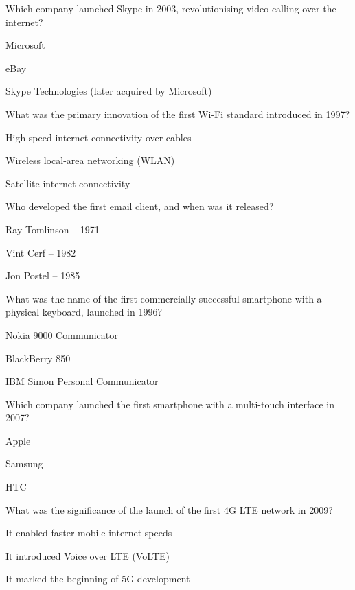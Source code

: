 \begin{enhancedmcq}{Which company launched Skype in 2003, revolutionising video calling over the internet?}
\item Microsoft
\item eBay
\item Skype Technologies (later acquired by Microsoft)

\end{enhancedmcq}
\begin{enhancedmcq}{What was the primary innovation of the first Wi-Fi standard introduced in 1997?}
\item High-speed internet connectivity over cables
\item Wireless local-area networking (WLAN)
\item Satellite internet connectivity

\end{enhancedmcq}
\begin{enhancedmcq}{Who developed the first email client, and when was it released?}
\item Ray Tomlinson – 1971
\item Vint Cerf – 1982
\item Jon Postel – 1985

\end{enhancedmcq}
\begin{enhancedmcq}{What was the name of the first commercially successful smartphone with a physical keyboard, launched in 1996?}
\item Nokia 9000 Communicator
\item BlackBerry 850
\item IBM Simon Personal Communicator

\end{enhancedmcq}
\begin{enhancedmcq}{Which company launched the first smartphone with a multi-touch interface in 2007?}
\item Apple
\item Samsung
\item HTC

\end{enhancedmcq}
\begin{enhancedmcq}{What was the significance of the launch of the first 4G LTE network in 2009?}
\item It enabled faster mobile internet speeds
\item It introduced Voice over LTE (VoLTE)
\item It marked the beginning of 5G development

\end{enhancedmcq}

